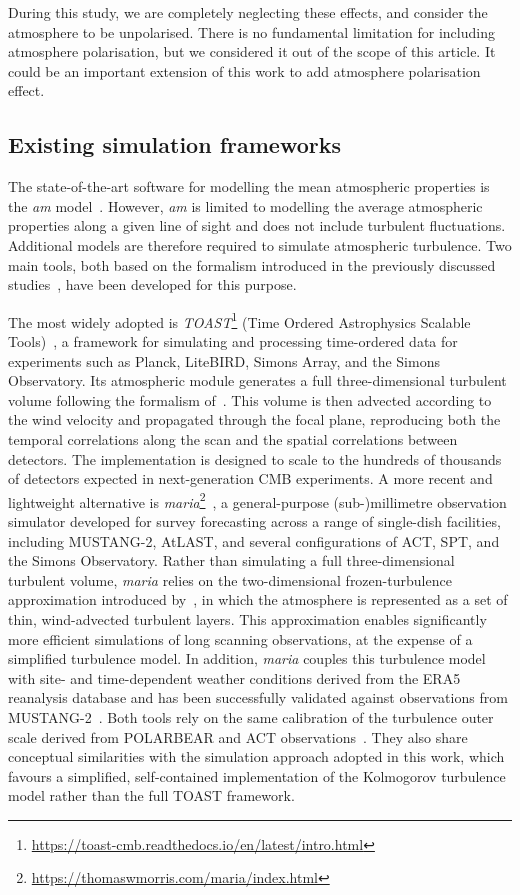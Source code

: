 \documentclass[a4paper,11pt]{article}
\begin{document}
During this study, we are completely neglecting these effects, and consider the atmosphere to be unpolarised. There is no fundamental limitation for including atmosphere polarisation, but we considered it out of the scope of this article. It could be an important extension of this work to add atmosphere polarisation effect.

\subsection{Existing simulation frameworks}
\label{sec:atm_frameworks}

The state-of-the-art software for modelling the mean atmospheric properties is the \emph{am} model~\cite{paine2024}. However, \emph{am} is limited to modelling the average atmospheric properties along a given line of sight and does not include turbulent fluctuations. Additional models are therefore required to simulate atmospheric turbulence. Two main tools, both based on the formalism introduced in the previously discussed studies~\cite{errard2015,morris2022}, have been developed for this purpose.

The most widely adopted is \emph{TOAST}\footnote{\url{https://toast-cmb.readthedocs.io/en/latest/intro.html}} (Time Ordered Astrophysics Scalable Tools)~\cite{TOAST}, a framework for simulating and processing time-ordered data for experiments such as Planck, LiteBIRD, Simons Array, and the Simons Observatory. Its atmospheric module generates a full three-dimensional turbulent volume following the formalism of~\cite{errard2015}. This volume is then advected according to the wind velocity and propagated through the focal plane, reproducing both the temporal correlations along the scan and the spatial correlations between detectors. The implementation is designed to scale to the hundreds of thousands of detectors expected in next-generation CMB experiments.
A more recent and lightweight alternative is \emph{maria}\footnote{\url{https://thomaswmorris.com/maria/index.html}}~\cite{maria}, a general-purpose (sub-)millimetre observation simulator developed for survey forecasting across a range of single-dish facilities, including MUSTANG-2, AtLAST, and several configurations of ACT, SPT, and the Simons Observatory. Rather than simulating a full three-dimensional turbulent volume, \emph{maria} relies on the two-dimensional frozen-turbulence approximation introduced by~\cite{morris2022}, in which the atmosphere is represented as a set of thin, wind-advected turbulent layers. This approximation enables significantly more efficient simulations of long scanning observations, at the expense of a simplified turbulence model. In addition, \emph{maria} couples this turbulence model with site- and time-dependent weather conditions derived from the ERA5 reanalysis database and has been successfully validated against observations from MUSTANG-2~\cite{maria}.
Both tools rely on the same calibration of the turbulence outer scale derived from POLARBEAR and ACT observations~\cite{errard2015}. They also share conceptual similarities with the simulation approach adopted in this work, which favours a simplified, self-contained implementation of the Kolmogorov turbulence model rather than the full TOAST framework.
\end{document}

